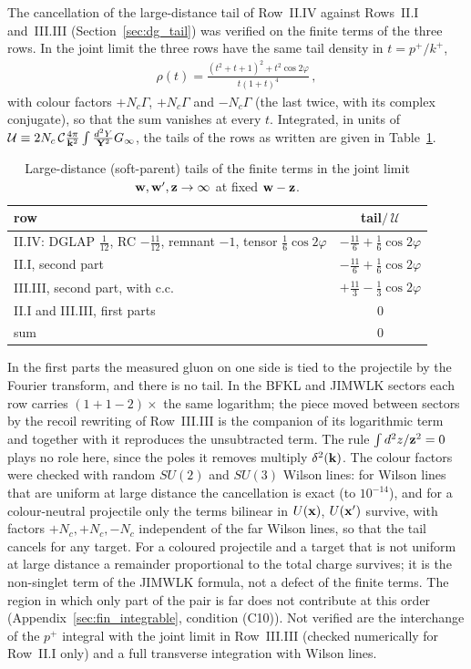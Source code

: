 The cancellation of the large-distance tail of Row~II.IV against Rows~II.I and~III.III (Section~\ref{sec:dg_tail}) was verified on the finite terms of the three rows. In the joint limit the three rows have the same tail density in $t=p^+/k^+$,
\begin{align}\label{eq:dg_taildens}
\rho(t)=\frac{(t^2+t+1)^2+t^2\cos2\varphi}{t(1+t)^4}\,,
\end{align}
with colour factors $+N_c\Gamma$, $+N_c\Gamma$ and $-N_c\Gamma$ (the last twice, with its complex conjugate), so that the sum vanishes at every $t$. Integrated, in units of $\mathcal U\equiv2N_c\,\mathcal C\frac{4\pi}{\mathbf{k}^2}\int\frac{d^2Y}{\mathbf{Y}^2}G_\infty$, the tails of the rows as written are given in Table~\ref{tab:tails}.
\begin{table}[t]\centering
\begin{tabular}{lc}\hline
row & tail$/\,\mathcal U$\\\hline
II.IV: DGLAP $\frac1{12}$, RC $-\frac{11}{12}$, remnant $-1$, tensor $\frac16\cos2\varphi$ & $-\frac{11}{6}+\frac16\cos2\varphi$\\
II.I, second part & $-\frac{11}{6}+\frac16\cos2\varphi$\\
III.III, second part, with c.c. & $+\frac{11}{3}-\frac13\cos2\varphi$\\
II.I and III.III, first parts & $0$\\\hline
sum & $0$\\\hline
\end{tabular}
\caption{Large-distance (soft-parent) tails of the finite terms in the joint limit $\mathbf{w},\mathbf{w}',\mathbf{z}\to\infty$ at fixed $\mathbf{w}-\mathbf{z}$.}\label{tab:tails}
\end{table}
In the first parts the measured gluon on one side is tied to the projectile by the Fourier transform, and there is no tail. In the BFKL and JIMWLK sectors each row carries $(1+1-2)\times$ the same logarithm; the piece moved between sectors by the recoil rewriting of Row~III.III is the companion of its logarithmic term and together with it reproduces the unsubtracted term. The rule $\int d^2z/\mathbf{z}^2=0$ plays no role here, since the poles it removes multiply $\delta^2(\mathbf{k})$. The colour factors were checked with random $SU(2)$ and $SU(3)$ Wilson lines: for Wilson lines that are uniform at large distance the cancellation is exact (to $10^{-14}$), and for a colour-neutral projectile only the terms bilinear in $U(\mathbf{x})$, $U(\mathbf{x}')$ survive, with factors $+N_c,+N_c,-N_c$ independent of the far Wilson lines, so that the tail cancels for any target. For a coloured projectile and a target that is not uniform at large distance a remainder proportional to the total charge survives; it is the non-singlet term of the JIMWLK formula, not a defect of the finite terms. The region in which only part of the pair is far does not contribute at this order (Appendix~\ref{sec:fin_integrable}, condition (C10)). Not verified are the interchange of the $p^+$ integral with the joint limit in Row~III.III (checked numerically for Row~II.I only) and a full transverse integration with Wilson lines.
\par\endgroup
